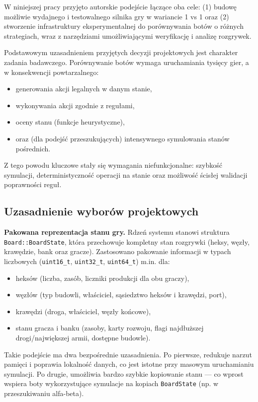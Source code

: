 \documentclass[polish,inz,longabstract]{iithesis}
\begin{document}
W niniejszej pracy przyjęto autorskie podejście łączące oba cele: (1) budowę możliwie wydajnego i testowalnego silnika gry w wariancie 1 vs 1 oraz (2) stworzenie infrastruktury eksperymentalnej do porównywania botów o różnych strategiach, wraz z narzędziami umożliwiającymi weryfikację i analizę rozgrywek.

Podstawowym uzasadnieniem przyjętych decyzji projektowych jest charakter zadania badawczego. Porównywanie botów wymaga uruchamiania tysięcy gier, a w konsekwencji powtarzalnego:
\begin{itemize}
\item generowania akcji legalnych w danym stanie,
\item wykonywania akcji zgodnie z regułami,
\item oceny stanu (funkcje heurystyczne),
\item oraz (dla podejść przeszukujących) intensywnego symulowania stanów pośrednich.
\end{itemize}

Z tego powodu kluczowe stały się wymagania niefunkcjonalne: szybkość symulacji, deterministyczność operacji na stanie oraz możliwość ścisłej walidacji poprawności reguł.

\subsection{Uzasadnienie wyborów projektowych}

\textbf{Pakowana reprezentacja stanu gry.} Rdzeń systemu stanowi struktura \newline \texttt{Board::BoardState}, która przechowuje kompletny stan rozgrywki (heksy, węzły, krawędzie, bank oraz gracze). Zastosowano pakowanie informacji w typach liczbowych (\texttt{uint16\_t}, \texttt{uint32\_t}, \texttt{uint64\_t}) m.in. dla:
\begin{itemize}
\item heksów (liczba, zasób, liczniki produkcji dla obu graczy),
\item węzłów (typ budowli, właściciel, sąsiedztwo heksów i krawędzi, port),
\item krawędzi (droga, właściciel, węzły końcowe),
\item stanu gracza i banku (zasoby, karty rozwoju, flagi najdłuższej drogi/największej armii, dostępne budowle).
\end{itemize}

Takie podejście ma dwa bezpośrednie uzasadnienia. Po pierwsze, redukuje narzut pamięci i poprawia lokalność danych, co jest istotne przy masowym uruchamianiu symulacji. Po drugie, umożliwia bardzo szybkie kopiowanie stanu — co wprost wspiera boty wykorzystujące symulacje na kopiach \texttt{BoardState} (np. w przeszukiwaniu alfa-beta).
\end{document}
